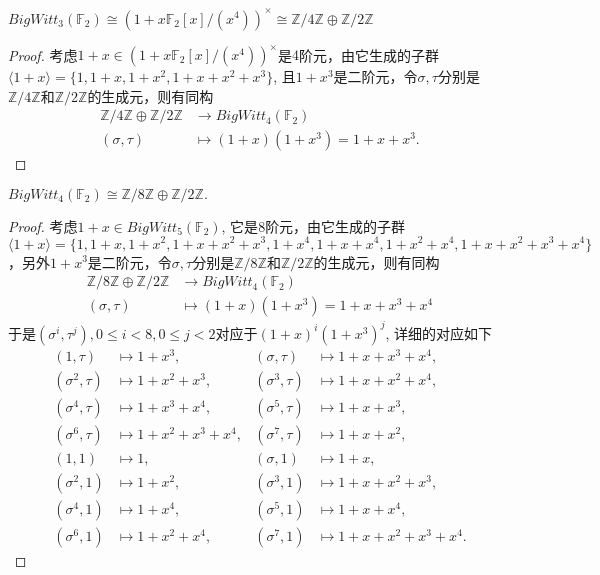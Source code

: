 \begin{example} 
\label{ex:W3(F2)}
	$BigWitt_3(\mathbb{F}_2)\cong (1+x\mathbb{F}_2[x]/(x^{4}))^{\times}\cong \mathbb{Z}/4 \mathbb{Z} \oplus\mathbb{Z}/2 \mathbb{Z}$
\end{example}
\begin{proof}
	考虑$1+x\in (1+x \mathbb{F}_2[x]/(x^4))^{\times}$是$4$阶元，由它生成的子群$\langle 1+x \rangle = \{1,1+x,1+x^2,1+x+x^2+x^3\}$, 且$1+x^3$是二阶元，令$\sigma,\tau$分别是$\mathbb{Z}/4 \mathbb{Z}$和$\mathbb{Z}/2 \mathbb{Z}$的生成元，则有同构
		\begin{align*}
		\mathbb{Z}/4 \mathbb{Z} \oplus \mathbb{Z}/2 \mathbb{Z} &\longrightarrow BigWitt_4(\mathbb{F}_2) \\
		(\sigma,\tau) & \mapsto (1+x)(1+x^3)=1+x+x^3. 
		\end{align*}
\end{proof}

\begin{example}
	$BigWitt_4(\mathbb{F}_2) \cong \mathbb{Z}/8 \mathbb{Z} \oplus \mathbb{Z}/2 \mathbb{Z}.$
\end{example}
\begin{proof}
	考虑$1+x \in BigWitt_5(\mathbb{F}_2)$, 它是$8$阶元，由它生成的子群$\langle 1+x \rangle = \{1,1+x,1+x^2,1+x+x^2+x^3,1+x^4,1+x+x^4,1+x^2+x^4,1+x+x^2+x^3+x^4\}$，另外$1+x^3$是二阶元，令$\sigma,\tau$分别是$\mathbb{Z}/8 \mathbb{Z}$和$\mathbb{Z}/2 \mathbb{Z}$的生成元，则有同构
	\begin{align*}
	\mathbb{Z}/8 \mathbb{Z} \oplus \mathbb{Z}/2 \mathbb{Z} &\longrightarrow BigWitt_4(\mathbb{F}_2) \\
	(\sigma,\tau) & \mapsto (1+x)(1+x^3)=1+x+x^3+x^4 
	\end{align*}
	于是$(\sigma^i,\tau^j), 0\leq i <8, 0\leq j<2$对应于$(1+x)^i(1+x^3)^j$, 详细的对应如下
	\begin{align*}
	(1,\tau) & \mapsto 1+x^3,& (\sigma,\tau) & \mapsto 1+x+x^3+x^4, \\
	 (\sigma^2,\tau) & \mapsto 1+x^2+x^3,& (\sigma^3,\tau) & \mapsto 1+x+x^2+x^4, \\
	(\sigma^4,\tau) & \mapsto 1+x^3+x^4, & (\sigma^5,\tau) & \mapsto 1+x+x^3, \\
	 (\sigma^6,\tau) & \mapsto 1+x^2+x^3+x^4, & (\sigma^7,\tau) & \mapsto 1+x+x^2, \\
	(1,1)& \mapsto 1,& (\sigma,1) & \mapsto 1+x, \\
	(\sigma^2,1) & \mapsto 1+x^2, & (\sigma^3,1) & \mapsto 1+x+x^2+x^3, \\
	(\sigma^4,1) & \mapsto 1+x^4, &
	(\sigma^5,1) & \mapsto 1+x+x^4, \\
	(\sigma^6,1) & \mapsto 1+x^2+x^4, & (\sigma^7,1) & \mapsto 1+x+x^2+x^3+x^4. 
	\end{align*}

\end{proof}



